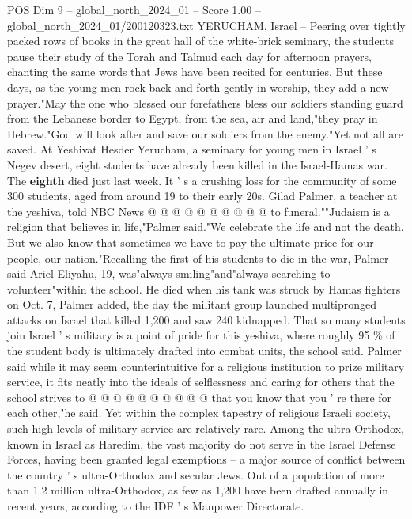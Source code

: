 \begin{textsample}{POS Dim 9 – global\_north\_2024\_01 – Score 1.00 – global\_north\_2024\_01/200120323.txt}  \label{ex:f9_pos_266}
YERUCHAM, Israel -- Peering over tightly packed rows of books in the great hall of the white-brick seminary, the students pause their study of the Torah and Talmud each day for afternoon prayers, chanting the same words that Jews have been recited for centuries.
But these days, as the young men rock back and forth gently in worship, they add a new prayer."May the one who blessed our forefathers bless our soldiers standing guard from the Lebanese border to Egypt, from the sea, air and land,"they pray in Hebrew."God will look after and save our soldiers from the enemy."Yet not all are saved.
At Yeshivat Hesder Yerucham, a seminary for young men in Israel ' s Negev desert, eight students have already been killed in the Israel-Hamas war.
The \textbf{eighth} died just last week.
It ' s a crushing loss for the community of some 300 students, aged from around 19 to their early 20s.
Gilad Palmer, a teacher at the yeshiva, told NBC News @ @ @ @ @ @ @ @ @ @ to funeral.""Judaism is a religion that believes in life,"Palmer said."We celebrate the life and not the death.
But we also know that sometimes we have to pay the ultimate price for our people, our nation."Recalling the first of his students to die in the war, Palmer said Ariel Eliyahu, 19, was"always smiling"and"always searching to volunteer"within the school.
He died when his tank was struck by Hamas fighters on Oct. 7, Palmer added, the day the militant group launched multipronged attacks on Israel that killed 1,200 and saw 240 kidnapped.
That so many students join Israel ' s military is a point of pride for this yeshiva, where roughly 95 \% of the student body is ultimately drafted into combat units, the school said.
Palmer said while it may seem counterintuitive for a religious institution to prize military service, it fits neatly into the ideals of selflessness and caring for others that the school strives to @ @ @ @ @ @ @ @ @ @ that you know that you ' re there for each other,"he said.
Yet within the complex tapestry of religious Israeli society, such high levels of military service are relatively rare.
Among the ultra-Orthodox, known in Israel as Haredim, the vast majority do not serve in the Israel Defense Forces, having been granted legal exemptions -- a major source of conflict between the country ' s ultra-Orthodox and secular Jews.
Out of a population of more than 1.2 million ultra-Orthodox, as few as 1,200 have been drafted annually in recent years, according to the IDF ' s Manpower Directorate.

\end{textsample}
